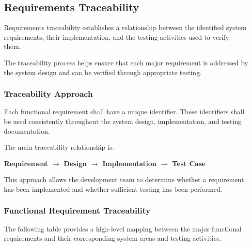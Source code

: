 \subsection{Requirements Traceability}

Requirements traceability establishes a relationship between the
identified system requirements, their implementation, and the testing
activities used to verify them.

The traceability process helps ensure that each major requirement is
addressed by the system design and can be verified through appropriate
testing.

\subsubsection{Traceability Approach}

Each functional requirement shall have a unique identifier. These
identifiers shall be used consistently throughout the system design,
implementation, and testing documentation.

The main traceability relationship is:

\begin{center}
\textbf{Requirement $\rightarrow$ Design $\rightarrow$ Implementation
$\rightarrow$ Test Case}
\end{center}

This approach allows the development team to determine whether a
requirement has been implemented and whether sufficient testing has been
performed.

\subsubsection{Functional Requirement Traceability}

The following table provides a high-level mapping between the major
functional requirements and their corresponding system areas and testing
activities.

